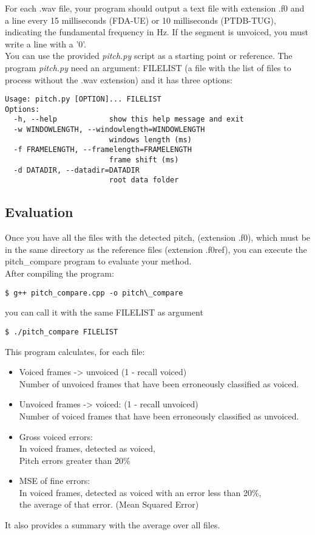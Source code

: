 \documentclass[a4paper,11pt]{article}
\begin{document}
For each .wav file, your program should output a text file with extension .f0 and a line every 15 milliseconds (FDA-UE) or 10 milliseconds (PTDB-TUG), indicating the fundamental frequency in Hz. If the segment is unvoiced, you must write a line with a ’0’.\\
You can use the provided \emph{pitch.py} script as a starting point or reference. The program \emph{pitch.py} need an argument: FILELIST (a file with the list of files to process without the .wav extension) and it has three options:
\begin{lstlisting}
Usage: pitch.py [OPTION]... FILELIST
Options:
  -h, --help            show this help message and exit
  -w WINDOWLENGTH, --windowlength=WINDOWLENGTH
                        windows length (ms)
  -f FRAMELENGTH, --framelength=FRAMELENGTH
                        frame shift (ms)
  -d DATADIR, --datadir=DATADIR
                        root data folder
\end{lstlisting}


\subsection*{Evaluation}
Once you have all the files with the detected pitch, (extension .f0), which must be in the same directory as the reference files (extension .f0ref), you can execute the pitch\_compare program to evaluate your method.\\

After compiling the program:
\begin{lstlisting}
$ g++ pitch_compare.cpp -o pitch\_compare
\end{lstlisting}
you can call it with the same FILELIST as argument
\begin{lstlisting}
$ ./pitch_compare FILELIST
\end{lstlisting}
This program calculates, for each file:
\begin{itemize}
\item Voiced frames -> unvoiced (1 - recall voiced)\\
  Number of unvoiced frames that have been erroneously classified as voiced.
\item Unvoiced frames -> voiced: (1 - recall unvoiced)\\
  Number of voiced frames that have been erroneously classified as unvoiced.
\item Gross voiced errors:\\
  In voiced frames, detected as voiced,\\
  Pitch errors greater than 20\%
\item MSE of fine errors:\\
  In voiced frames, detected as voiced with an error less than 20\%,\\
  the average of that error. (Mean Squared Error)
\end{itemize}
It also provides a summary with the average over all files.
\end{document}
